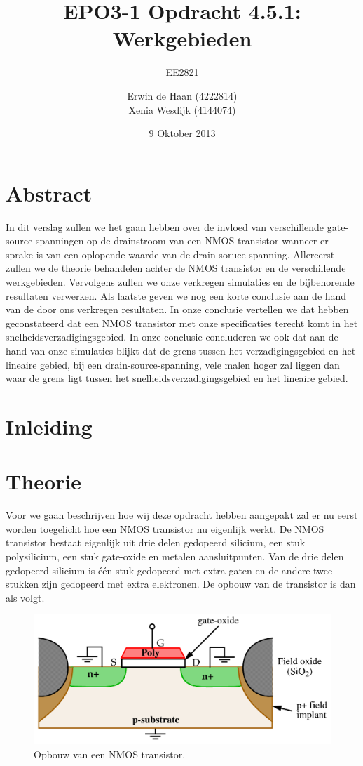 \documentclass{scrartcl}  %
\author{Erwin {de Haan} (4222814)  \\{Xenia Wesdijk} (4144074)}
\title{EPO3-1   Opdracht 4.5.1: Werkgebieden}
\subtitle{EE2821}
\date{9 Oktober 2013}
\begin{document}
\maketitle
{}
\vspace{80 mm}
\section*{Abstract}
In dit verslag zullen we het gaan hebben over de invloed van verschillende gate-source-spanningen op de drainstroom van een NMOS transistor wanneer er sprake is van een oplopende waarde van de drain-soruce-spanning. Allereerst zullen we de theorie behandelen achter de NMOS transistor en de verschillende werkgebieden. Vervolgens zullen we onze verkregen simulaties en de bijbehorende resultaten verwerken. Als laatste geven we nog een korte conclusie aan de hand van de door ons verkregen resultaten. In onze conclusie vertellen we dat hebben geconstateerd dat een NMOS transistor met onze specificaties terecht komt in het snelheidsverzadigingsgebied. In onze conclusie concluderen we ook dat aan de hand van onze simulaties blijkt dat de grens tussen het verzadigingsgebied en het lineaire gebied, bij een drain-source-spanning, vele malen hoger zal liggen dan waar de grens ligt tussen het snelheidsverzadigingsgebied en het lineaire gebied.
\newpage
\setlength{\cftbeforetoctitleskip}{-3em}
\tableofcontents

\section{Inleiding}

\newpage


\section{Theorie}
Voor we gaan beschrijven hoe wij deze opdracht hebben aangepakt zal er nu eerst worden toegelicht hoe een NMOS transistor nu eigenlijk werkt. De NMOS transistor bestaat eigenlijk uit drie delen gedopeerd silicium, een stuk polysilicium, een stuk gate-oxide en metalen aansluitpunten. Van de drie delen gedopeerd silicium is één stuk gedopeerd met extra gaten en de andere twee stukken zijn gedopeerd met extra elektronen. De opbouw van de transistor is dan als volgt.
\begin{figure}[H]
\centering
		\includegraphics[width=\textwidth]{resources/MOS-opbouw}
		\caption{Opbouw van een NMOS transistor.\cite{patel-slides}}
		\label{fig:NMOS-transistor}
\end{figure}
\end{document}
